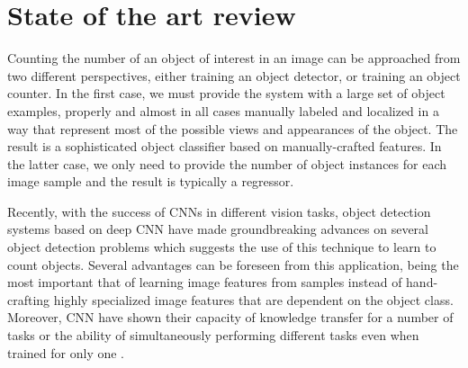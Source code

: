 \newpage
\chapter{State of the art review}
\label{sec:related_work}

Counting the number of an object of interest in an image can be approached from two different perspectives, either training an object detector, or training an object counter\cite{segui2015learning}. In the first case, we must provide the system with a large set of object examples, properly and almost in all cases manually labeled and localized in a way that represent most of the possible views and appearances of the object. The result is a sophisticated object classifier based on manually-crafted features\cite{viola2004robust, viola2005detecting}. In the latter case, we only need to provide the number of object instances for each image sample and the result is typically a regressor\cite{lempitsky2010learning}.  

Recently, with the success of CNNs in different vision tasks, object detection systems based on deep CNN have made groundbreaking advances on several object detection problems\cite{zhang2015improving, erhan2014scalable, girshick2014rich, he2015spatial, erhan2014scalable} which suggests the use of this technique to learn to count objects. Several advantages can be foreseen from this application, being the most important that of learning image features from samples instead of hand-crafting highly specialized image features that are dependent on the object class\cite{segui2015learning}. Moreover, CNN have shown their capacity of knowledge transfer for a number of tasks or the ability of simultaneously performing different tasks even when trained for only one \cite{zhou2014learning}. 

